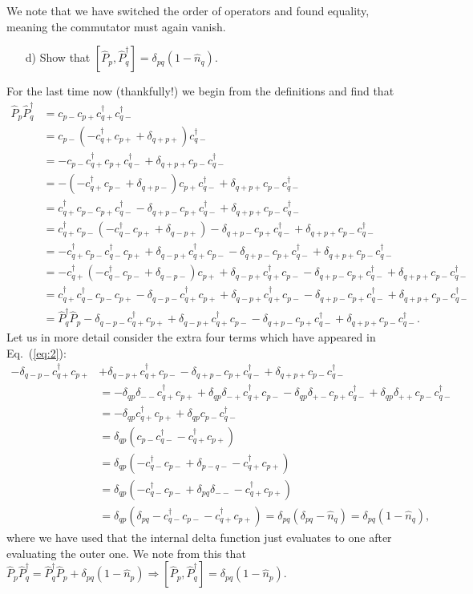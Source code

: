 \documentclass[a4paper]{article}
\newcommand{\eq} [1]{Eq.\ (\ref{eq:#1})}
\newcommand{\nn}{\nonumber}
\newcommand{\cpp}{c_{p+}}
\newcommand{\cpm}{c_{p-}}
\newcommand{\cqpd}{c_{q+}^\dagger}
\newcommand{\cqmd}{c_{q-}^\dagger}
\begin{document}
We note that we have switched the order of operators and found equality, meaning the commutator must again vanish.
\begin{exframe}
\begin{itemize}
  \item[d)] Show that $[\hat P_p, \hat P_q^\dagger] = \delta_{pq}(1-\hat n_q).$
\end{itemize}
\end{exframe}
For the last time now (thankfully!) we begin from the definitions and find that
\begin{align}
\hat P_p \hat P_q^\dagger &= \cpm \cpp \cqpd \cqmd \nn\\
%
&= \cpm (-\cqpd\cpp + \delta_{q+p+}) \cqmd \nn\\
%
&= -\cpm \cqpd\cpp \cqmd + \delta_{q+p+} \cpm\cqmd \nn\\
%
&= -(- \cqpd\cpm + \delta_{q+p-})\cpp \cqmd + \delta_{q+p+} \cpm\cqmd \nn\\
%
&= \cqpd\cpm \cpp \cqmd - \delta_{q+p-}\cpp \cqmd + \delta_{q+p+} \cpm\cqmd \nn\\
%
&= \cqpd\cpm (-\cqmd\cpp + \delta_{q-p+}) - \delta_{q+p-}\cpp \cqmd + \delta_{q+p+} \cpm\cqmd \nn\\
%
&= -\cqpd\cpm \cqmd\cpp + \delta_{q-p+}\cqpd\cpm - \delta_{q+p-}\cpp \cqmd + \delta_{q+p+} \cpm\cqmd \nn\\
%
&= -\cqpd(- \cqmd\cpm + \delta_{q-p-})\cpp + \delta_{q-p+}\cqpd\cpm - \delta_{q+p-}\cpp \cqmd + \delta_{q+p+} \cpm\cqmd \nn\\
%
&= \cqpd\cqmd\cpm \cpp - \delta_{q-p-} \cqpd\cpp+ \delta_{q-p+}\cqpd\cpm - \delta_{q+p-}\cpp \cqmd + \delta_{q+p+} \cpm\cqmd \nn\\
&= \hat P_q^\dagger \hat P_p - \delta_{q-p-} \cqpd\cpp+ \delta_{q-p+}\cqpd\cpm - \delta_{q+p-}\cpp \cqmd + \delta_{q+p+} \cpm\cqmd. \label{eq:2}
\end{align}
Let us in more detail consider the extra four terms which have appeared in \eq{2}:
\begin{align}
- \delta_{q-p-} \cqpd\cpp&+ \delta_{q-p+}\cqpd\cpm - \delta_{q+p-}\cpp \cqmd + \delta_{q+p+} \cpm\cqmd \nn\\
&= - \delta_{qp}\delta_{--} \cqpd\cpp+ \delta_{qp}\delta_{-+}\cqpd\cpm - \delta_{qp}\delta_{+-}\cpp \cqmd + \delta_{qp}\delta_{++} \cpm\cqmd \nn\\
%
&= - \delta_{qp} \cqpd\cpp+  \delta_{qp} \cpm\cqmd \nn\\
%
&= \delta_{qp}\left(\cpm\cqmd  -\cqpd\cpp \right)\nn\\
%
&= \delta_{qp}\left(-\cqmd\cpm + \delta_{p-q-}  -\cqpd\cpp \right)\nn\\
%
&= \delta_{qp}\left(-\cqmd\cpm + \delta_{pq}\delta_{--}  -\cqpd\cpp \right)\nn\\
%
&= \delta_{qp}\left(\delta_{pq} -\cqmd\cpm  -\cqpd\cpp \right) = \delta_{pq}\left(\delta_{pq} - \hat n_q\right) = \delta_{pq}\left(1 - \hat n_q\right),
\end{align}
where we have used that the internal delta function just evaluates to one after evaluating the outer one. We note from this that $\hat P_p \hat P_q^\dagger = \hat P_q^\dagger \hat P_p + \delta_{pq} (1 - \hat n_p) \Rightarrow [\hat P_p, \hat P_q^\dagger] = \delta_{pq}(1-\hat n_p)$. 
\end{document}
